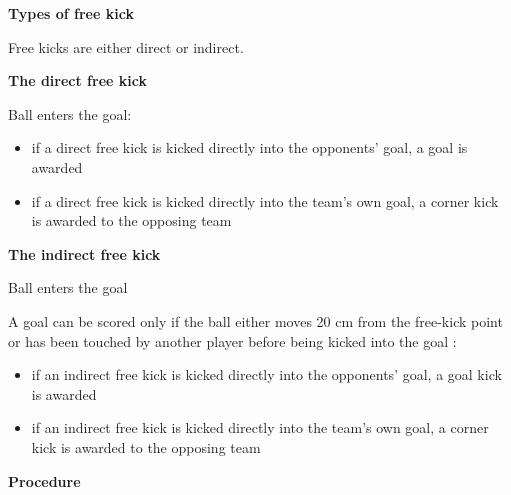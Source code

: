 \clearpage
\sffamily
{\bfseries\color[rgb]{0.4,0.4,0.4}{Law 13 -- Free Kicks} }
{\color{magenta}
{}

\bigskip

{\bfseries Types of free kick}

\headlinebox

Free kicks are either direct or indirect.

\bigskip

{\bfseries The direct free kick }

\headlinebox

Ball enters the goal:

\begin{itemize}
\item if a direct free kick is kicked directly into the
opponents{\textquoteright} goal, a goal is awarded
\item if a direct free kick is kicked directly into the team's own goal, a corner kick is awarded to the opposing team
\end{itemize}

\bigskip

{\bfseries The indirect free kick}

\headlinebox



\bigskip

Ball enters the goal

A goal can be scored only if the ball either moves 20 cm from the free-kick point or has been touched by another player before being kicked into the goal :

\begin{itemize}
\item if an indirect free kick is kicked directly into the
opponents' goal, a goal kick is awarded
\item if an indirect free kick is kicked directly into the
team's own goal, a corner kick is awarded to the
opposing team
\end{itemize}

\bigskip

{\bfseries Procedure}

}
